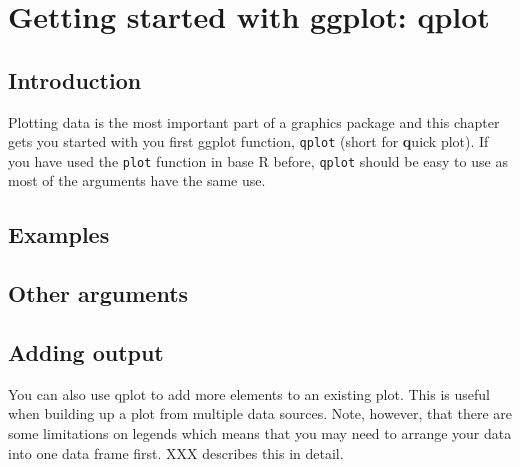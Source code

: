 

\chapter{Getting started with ggplot: qplot}

\section{Introduction}

Plotting data is the most important part of a graphics package and this chapter gets you started with you first ggplot function, {\tt qplot} (short for {\bf q}uick plot).  If you have used the {\tt plot} function in base R before, {\tt qplot} should be easy to use as most of the arguments have the same use.  


\section{Examples}

\section{Other arguments}

\section{Adding output}

You can also use qplot to add more elements to an existing plot.  This is useful when building up a plot from multiple data sources.  Note, however, that there are some limitations on legends which means that you may need to arrange your data into one data frame first.  XXX describes this in detail.



